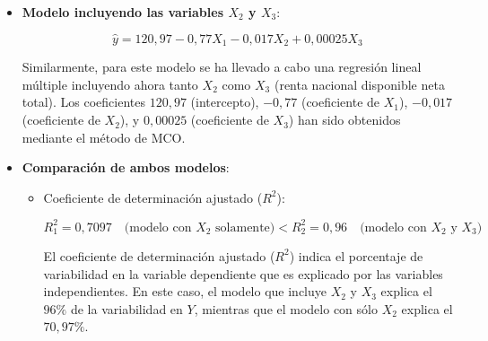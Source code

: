 \documentclass[a4paper,12pt]{article}
\begin{document}
\begin{itemize}
\begin{itemize}
    \item Y calculamos de manera análoga la siguiente matriz:
    \begin{equation*}
        X^{\prime}Y = \begin{pmatrix}
            \sum_{i=1}^{10} Y_{t} \\
            \sum_{i=1}^{10} X_{1_i}Y_{t} \\
            \sum_{i=1}^{10} X_{2_i}Y_{t}
        \end{pmatrix}
    \end{equation*}

    \item Por último, calculamos la matriz de del estimador, aplicando el estimador de MCO:
    \begin{equation*}
        \hat{\beta} = (X^{\prime}X)^{-1}X^{\prime}Y
    \end{equation*}


  \end{itemize}

  \item \textbf{Modelo incluyendo las variables \(X_2\) y \(X_3\)}:
  

\[
  \hat{y} = 120,97 - 0,77X_1 - 0,017X_2 + 0,00025X_3
  \]



  Similarmente, para este modelo se ha llevado a cabo una regresión lineal múltiple incluyendo ahora tanto \(X_2\) como \(X_3\) (renta nacional disponible neta total). Los coeficientes \(120,97\) (intercepto), \(-0,77\) (coeficiente de \(X_1\)), \(-0,017\) (coeficiente de \(X_2\)), y \(0,00025\) (coeficiente de \(X_3\)) han sido obtenidos mediante el método de MCO.

  \item \textbf{Comparación de ambos modelos}:
  \begin{itemize}
    \item Coeficiente de determinación ajustado (\(R^2\)):
    

\[
    R^2_1 = 0,7097 \quad \text{(modelo con \(X_2\) solamente)} < R^2_2 = 0,96 \quad \text{(modelo con \(X_2\) y \(X_3\))}
    \]


    El coeficiente de determinación ajustado (\(R^2\)) indica el porcentaje de variabilidad en la variable dependiente que es explicado por las variables independientes. En este caso, el modelo que incluye \(X_2\) y \(X_3\) explica el \(96\%\) de la variabilidad en \(Y\), mientras que el modelo con sólo \(X_2\) explica el \(70,97\%\).


\end{itemize}
\end{itemize}
\end{document}
